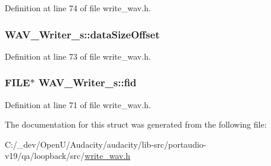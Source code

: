 Definition at line 74 of file write\+\_\+wav.\+h.

\subsubsection[{\texorpdfstring{data\+Size\+Offset}{dataSizeOffset}}]{ W\+A\+V\+\_\+\+Writer\+\_\+s\+::data\+Size\+Offset}\hypertarget{struct_w_a_v___writer__s_afdd3a21bb15aef80748a23b25f7eeb07}{}\label{struct_w_a_v___writer__s_afdd3a21bb15aef80748a23b25f7eeb07}


Definition at line 73 of file write\+\_\+wav.\+h.

\subsubsection[{\texorpdfstring{fid}{fid}}]{\setlength{\rightskip}{0pt plus 5cm}F\+I\+LE$\ast$ W\+A\+V\+\_\+\+Writer\+\_\+s\+::fid}\hypertarget{struct_w_a_v___writer__s_a273407f275b72472fa44a353abc3a83d}{}\label{struct_w_a_v___writer__s_a273407f275b72472fa44a353abc3a83d}


Definition at line 71 of file write\+\_\+wav.\+h.



The documentation for this struct was generated from the following file\+:\begin{DoxyCompactItemize}
\item 
C\+:/\+\_\+dev/\+Open\+U/\+Audacity/audacity/lib-\/src/portaudio-\/v19/qa/loopback/src/\hyperlink{write__wav_8h}{write\+\_\+wav.\+h}\end{DoxyCompactItemize}
